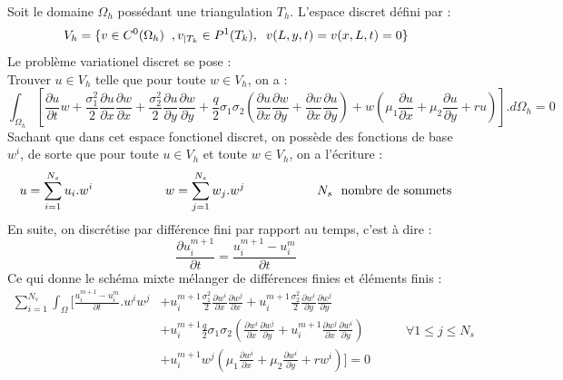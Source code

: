 \documentclass{book}
\begin{document}
Soit le domaine $\Omega_{h}$ possédant une triangulation $T_{h}$. L'espace discret défini par :
\[V_{h}=\{v \in C^{0}(\Omega_{h})\hspace{0.2cm},v_{|T_{k}} \in P^{1}(T_{k}),\hspace{0.2cm} v(L,y,t)=v(x,L,t)=0\}\]
Le problème variationel discret se pose : \\
Trouver $u \in V_{h}$ telle que pour toute $w \in V_{h}$, on a :
\[\int_{\Omega_{h}}[\frac{\partial u}{\partial t}w+\frac{\sigma_{1}^{2}}{2}\frac{\partial u}{\partial x}\frac{\partial w}{\partial x}+\frac{\sigma_{2}^{2}}{2}\frac{\partial u}{\partial y}\frac{\partial w}{\partial y}+\frac{q}{2}\sigma_{1}\sigma_{2}(\frac{\partial u}{\partial x}\frac{\partial w}{\partial y}+\frac{\partial w}{\partial x}\frac{\partial u}{\partial y})+w(\mu_{1}\frac{\partial u}{\partial x}+\mu_{2}\frac{\partial u}{\partial y}+ru)].d\Omega_{h}=0\]
Sachant que dans cet espace fonctionel discret, on possède des fonctions de base $w^{i}$, de sorte que pour toute $u \in V_{h}$ et toute $w \in V_{h}$, on a l'écriture : 
\[
u=\sum_{i=1}^{N_{s}} u_{i}.w^{i} \hspace{2cm} 
w=\sum_{j=1}^{N_{s}} w_{j}.w^{j} \hspace{2cm} 
N_{s} ~~\hbox{nombre de sommets}
\]
En suite, on discrétise par différence fini par rapport au temps, c'est à dire :
\[
\frac{\partial u_{i}^{m+1}}{\partial t} = \frac{u_{i}^{m+1}-u_{i}^{m}}{\partial t}
\]
Ce qui donne le schéma mixte mélanger de différences finies et éléments finis :
\[
\begin{split}
 \sum_{i=1}^{N_{s}} \int_\Omega[\frac{u_{i}^{m+1}-u_{i}^{m}}{\partial t}.w^{i}w^{j} 
 &+ u_{i}^{m+1}\frac{\sigma_1^2}2\frac{\partial w^{i}}{\partial x}\frac{\partial w^{j}}{\partial x}
 + u_{i}^{m+1}\frac{\sigma_2^2}2\frac{\partial w^{i}}{\partial y}\frac{\partial w^{j}}{\partial y}\\
 &+ u_{i}^{m+1}\frac{q}{2}\sigma_1\sigma_2(\frac{\partial w^{i}}{\partial x}\frac{\partial w^{j}}{\partial y}
 + u_{i}^{m+1}\frac{\partial w^{j}} {\partial x}\frac{\partial w^{i}}{\partial y})\\
 &+ u_{i}^{m+1}w^{j}(\mu_1\frac{\partial w^{i}}{\partial x}+\mu_2\frac{\partial w^{i}}{\partial y} +r w^{i})] =0
\end{split}
\hspace{1cm}
\forall 1 \leq j \leq N_s
\]
\end{document}

